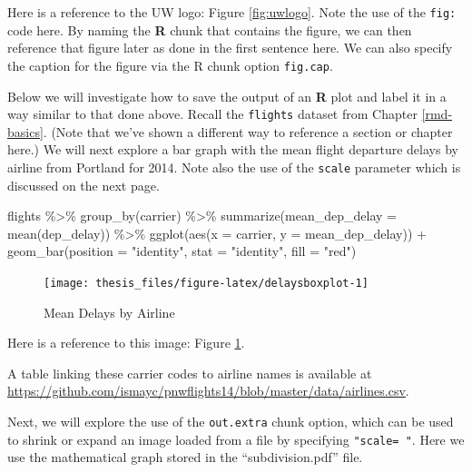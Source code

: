 \documentclass[print]{nuthesis}
\newenvironment{Shaded}{\begin{snugshade}}{\end{snugshade}}
\newcommand{\AttributeTok}[1]{\textcolor[rgb]{0.77,0.63,0.00}{#1}}
\newcommand{\FunctionTok}[1]{\textcolor[rgb]{0.00,0.00,0.00}{#1}}
\newcommand{\NormalTok}[1]{#1}
\newcommand{\SpecialCharTok}[1]{\textcolor[rgb]{0.00,0.00,0.00}{#1}}
\newcommand{\StringTok}[1]{\textcolor[rgb]{0.31,0.60,0.02}{#1}}
\begin{document}
Here is a reference to the UW logo: Figure \ref{fig:uwlogo}. Note the use of the \texttt{fig:} code here. By naming the \textbf{R} chunk that contains the figure, we can then reference that figure later as done in the first sentence here. We can also specify the caption for the figure via the R chunk option \texttt{fig.cap}.

\clearpage

Below we will investigate how to save the output of an \textbf{R} plot and label it in a way similar to that done above. Recall the \texttt{flights} dataset from Chapter \ref{rmd-basics}. (Note that we've shown a different way to reference a section or chapter here.) We will next explore a bar graph with the mean flight departure delays by airline from Portland for 2014. Note also the use of the \texttt{scale} parameter which is discussed on the next page.

\begin{Shaded}
\begin{Highlighting}[]
\NormalTok{flights }\SpecialCharTok{\%\textgreater{}\%} \FunctionTok{group\_by}\NormalTok{(carrier) }\SpecialCharTok{\%\textgreater{}\%} \FunctionTok{summarize}\NormalTok{(}\AttributeTok{mean\_dep\_delay =} \FunctionTok{mean}\NormalTok{(dep\_delay)) }\SpecialCharTok{\%\textgreater{}\%} 
    \FunctionTok{ggplot}\NormalTok{(}\FunctionTok{aes}\NormalTok{(}\AttributeTok{x =}\NormalTok{ carrier, }\AttributeTok{y =}\NormalTok{ mean\_dep\_delay)) }\SpecialCharTok{+} 
    \FunctionTok{geom\_bar}\NormalTok{(}\AttributeTok{position =} \StringTok{"identity"}\NormalTok{, }\AttributeTok{stat =} \StringTok{"identity"}\NormalTok{, }
        \AttributeTok{fill =} \StringTok{"red"}\NormalTok{)}
\end{Highlighting}
\end{Shaded}

\begin{figure}
\texttt{[image: thesis\_files/figure-latex/delaysboxplot-1]} \caption{Mean Delays by Airline}\label{fig:delaysboxplot}
\end{figure}

Here is a reference to this image: Figure \ref{fig:delaysboxplot}.

A table linking these carrier codes to airline names is available at \url{https://github.com/ismayc/pnwflights14/blob/master/data/airlines.csv}.

\clearpage

Next, we will explore the use of the \texttt{out.extra} chunk option, which can be used to shrink or expand an image loaded from a file by specifying \texttt{"scale=\ "}. Here we use the mathematical graph stored in the ``subdivision.pdf'' file.
\end{document}
